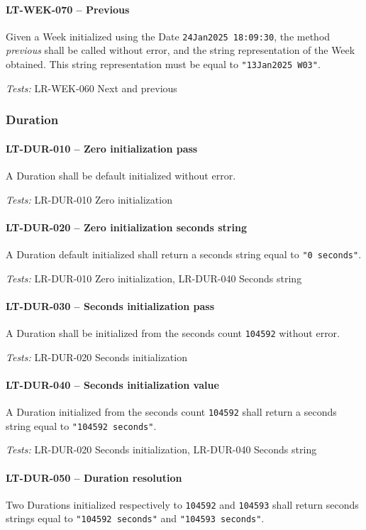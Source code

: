 \paragraph{LT-WEK-070 -- Previous}
Given a Week initialized using the Date \lstinline{24Jan2025 18:09:30},
the method \emph{previous} shall be called without error, and
the string representation of the Week obtained.
This string representation must be equal to \lstinline{"13Jan2025 W03"}.

\textit{Tests: } LR-WEK-060 Next and previous

\subsubsection{Duration}
\paragraph{LT-DUR-010 -- Zero initialization pass}
A Duration shall be default initialized without error.

\textit{Tests: } LR-DUR-010 Zero initialization

\paragraph{LT-DUR-020 -- Zero initialization seconds string}
A Duration default initialized shall return a seconds string
equal to \lstinline{"0 seconds"}.

\textit{Tests: } LR-DUR-010 Zero initialization, LR-DUR-040 Seconds string

\paragraph{LT-DUR-030 -- Seconds initialization pass}
A Duration shall be initialized from the seconds count \lstinline{104592}
without error.

\textit{Tests: } LR-DUR-020 Seconds initialization

\paragraph{LT-DUR-040 -- Seconds initialization value}
A Duration initialized from the seconds count \lstinline{104592}
shall return a seconds string equal to \lstinline{"104592 seconds"}.

\textit{Tests: } LR-DUR-020 Seconds initialization, LR-DUR-040 Seconds string

\paragraph{LT-DUR-050 -- Duration resolution}
Two Durations initialized respectively to \lstinline{104592} and
\lstinline{104593} shall return seconds strings equal to
\lstinline{"104592 seconds"} and \lstinline{"104593 seconds"}.

